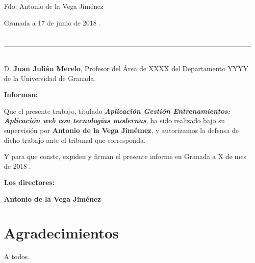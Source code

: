 \noindent Fdo: Antonio de la Vega Jiménez

\vspace{2cm}

\begin{flushright}
Granada a 17 de junio de 2018 .
\end{flushright}


\chapter*{}
\thispagestyle{empty}

\noindent\rule[-1ex]{\textwidth}{2pt}\\[4.5ex]

D. \textbf{Juan Julián Merelo}, Profesor del Área de XXXX del Departamento YYYY de la Universidad de Granada.

\vspace{0.5cm}

\textbf{Informan:}

\vspace{0.5cm}

Que el presente trabajo, titulado \textit{\textbf{Aplicación Gestión Entrenamientos: Aplicación web con tecnologías modernas}},
ha sido realizado bajo su supervisión por \textbf{Antonio de la Vega Jimémez}, y autorizamos la defensa de dicho trabajo ante el tribunal
que corresponda.

\vspace{0.5cm}

Y para que conste, expiden y firman el presente informe en Granada a X de mes de 2018 .

\vspace{1cm}

\textbf{Los directores:}

\vspace{5cm}

\noindent \textbf{Antonio de la Vega Jiménez \ \ \ \ \ }

\chapter*{Agradecimientos}
\thispagestyle{empty}

       \vspace{1cm}


A todos.

